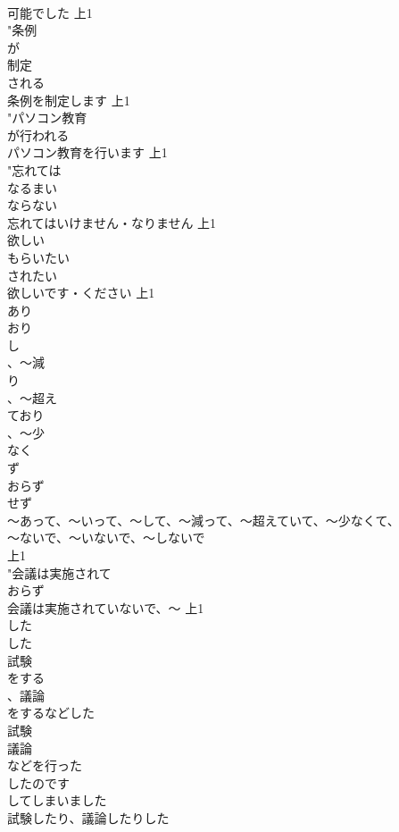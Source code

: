 \documentclass[8pt]{extreport}
\begin{document}
\begin{CJK}{UTF8}{min}
\\	可能でした			上1
\\	"条例
\\	が
\\	制定
\\	される
\\	条例を制定します			上1
\\	"パソコン教育
\\	が行われる
\\	パソコン教育を行います			上1
\\	"忘れては
\\	なるまい
\\	ならない
\\	忘れてはいけません・なりません			上1
\\	欲しい
\\	もらいたい
\\	されたい
\\	欲しいです・ください			上1
\\	あり
\\	おり
\\	し
\\	、～減
\\	り
\\	、～超え
\\	ており
\\	、～少
\\	なく
\\	ず
\\	おらず
\\	せず
\\	～あって、～いって、～して、～減って、～超えていて、～少なくて、
\\	～ないで、～いないで、～しないで
\\	上1
\\	"会議は実施されて
\\	おらず
\\	会議は実施されていないで、～			上1
\\	した
\\	した
\\	試験
\\	をする
\\	、議論
\\	をするなどした
\\	試験
\\	議論
\\	などを行った
\\	したのです
\\	してしまいました
\\	試験したり、議論したりした

\end{CJK}
\end{document}
